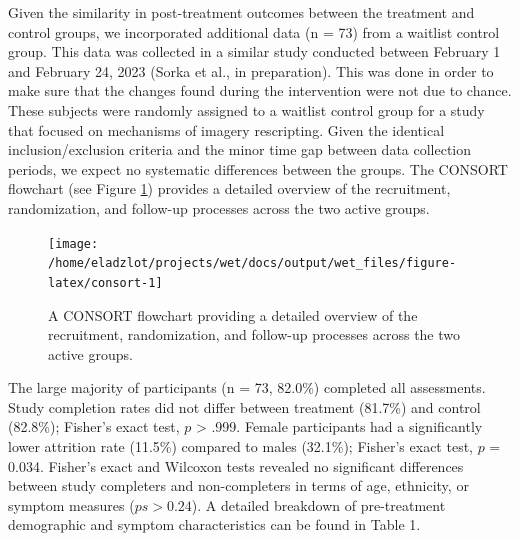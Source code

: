 \documentclass[
  man,floatsintext]{apa7}
\begin{document}
Given the similarity in post-treatment outcomes between the treatment and control groups, we incorporated additional data (n = 73) from a waitlist control group.
This data was collected in a similar study conducted between February 1 and February 24, 2023 (Sorka et al., in preparation).
This was done in order to make sure that the changes found during the intervention were not due to chance.
These subjects were randomly assigned to a waitlist control group for a study that focused on mechanisms of imagery rescripting.
Given the identical inclusion/exclusion criteria and the minor time gap between data collection periods, we expect no systematic differences between the groups.
The CONSORT flowchart (see Figure \ref{fig:consort}) provides a detailed overview of the recruitment, randomization, and follow-up processes across the two active groups.



\begin{figure}
\texttt{[image: /home/eladzlot/projects/wet/docs/output/wet\_files/figure-latex/consort-1]} \caption{A CONSORT flowchart providing a detailed overview of the recruitment, randomization, and follow-up processes across the two active groups.}\label{fig:consort}
\end{figure}

The large majority of participants (n = 73, 82.0\%) completed all assessments.
Study completion rates did not differ between treatment (81.7\%) and control (82.8\%); Fisher's exact test, \(p\) \textgreater{} .999.
Female participants had a significantly lower attrition rate (11.5\%) compared to males (32.1\%); Fisher's exact test, \(p\) = 0.034.
Fisher's exact and Wilcoxon tests revealed no significant differences between study completers and non-completers in terms of age, ethnicity, or symptom measures (\(ps > 0.24\)).
A detailed breakdown of pre-treatment demographic and symptom characteristics can be found in Table 1.
\end{document}
